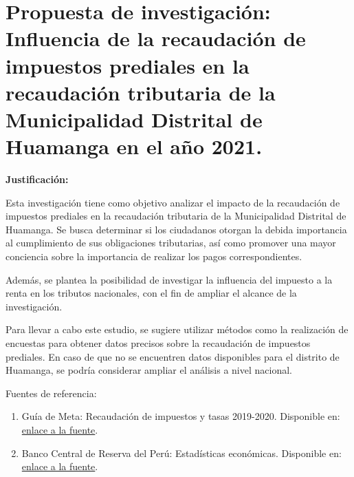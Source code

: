 \documentclass[
  man,
  floatsintext,
  longtable,
  a4paper,
  nolmodern,
  notxfonts,
  notimes,
  colorlinks=true,linkcolor=blue,citecolor=blue,urlcolor=blue]{apa7}
\begin{document}
\section{Propuesta de investigación: Influencia de la recaudación de
impuestos prediales en la recaudación tributaria de la Municipalidad
Distrital de Huamanga en el año
2021.}\label{propuesta-de-investigaciuxf3n-influencia-de-la-recaudaciuxf3n-de-impuestos-prediales-en-la-recaudaciuxf3n-tributaria-de-la-municipalidad-distrital-de-huamanga-en-el-auxf1o-2021.}

\textbf{Justificación:}

Esta investigación tiene como objetivo analizar el impacto de la
recaudación de impuestos prediales en la recaudación tributaria de la
Municipalidad Distrital de Huamanga. Se busca determinar si los
ciudadanos otorgan la debida importancia al cumplimiento de sus
obligaciones tributarias, así como promover una mayor conciencia sobre
la importancia de realizar los pagos correspondientes.

Además, se plantea la posibilidad de investigar la influencia del
impuesto a la renta en los tributos nacionales, con el fin de ampliar el
alcance de la investigación.

Para llevar a cabo este estudio, se sugiere utilizar métodos como la
realización de encuestas para obtener datos precisos sobre la
recaudación de impuestos prediales. En caso de que no se encuentren
datos disponibles para el distrito de Huamanga, se podría considerar
ampliar el análisis a nivel nacional.

Fuentes de referencia:

\begin{enumerate}
\def\labelenumi{\arabic{enumi}.}
\item
  Guía de Meta: Recaudación de impuestos y tasas 2019-2020. Disponible
  en:
  \href{https://www.mef.gob.pe/contenidos/presu_publ/migl/metas/GUIA_META_2_rcaudacion2019_2020.pdf}{enlace
  a la fuente}.
\item
  Banco Central de Reserva del Perú: Estadísticas económicas. Disponible
  en:
  \href{https://estadisticas.bcrp.gob.pe/estadisticas/series/mensuales/resultados/RD13778DM/html}{enlace
  a la fuente}.
\end{enumerate}
\end{document}
